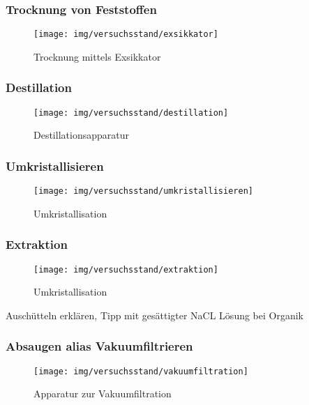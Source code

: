\subsubsection*{Trocknung von Feststoffen}
\begin{figure}[h!]
	\centering
	\texttt{[image: img/versuchsstand/exsikkator]}
	\caption{Trocknung mittels Exsikkator}
	\label{fig:trocknung}
\end{figure}
\FloatBarrier

\subsubsection*{Destillation}
\begin{figure}[h!]
	\centering
	\texttt{[image: img/versuchsstand/destillation]}
	\caption{Destillationsapparatur}
	\label{fig:destillation}
\end{figure}
\FloatBarrier

\subsubsection*{Umkristallisieren}
\begin{figure}[h!]
	\centering
	\texttt{[image: img/versuchsstand/umkristallisieren]}
	\caption{Umkristallisation}
	\label{fig:umkristallisieren}
\end{figure}
\FloatBarrier

\subsubsection*{Extraktion}
\label{sec:extraktion}
\begin{figure}[h!]
	\centering
	\texttt{[image: img/versuchsstand/extraktion]}
	\caption{Umkristallisation}
	\label{fig:extraktion}
\end{figure}
\FloatBarrier
Auschütteln erklären, Tipp mit gesättigter NaCL Lösung bei Organik

\subsubsection*{Absaugen alias Vakuumfiltrieren}
\begin{figure}[h!]
	\centering
	\texttt{[image: img/versuchsstand/vakuumfiltration]}
	\caption{Apparatur zur Vakuumfiltration}
	\label{fig:vakuumfiltrieren}
\end{figure}
\FloatBarrier

